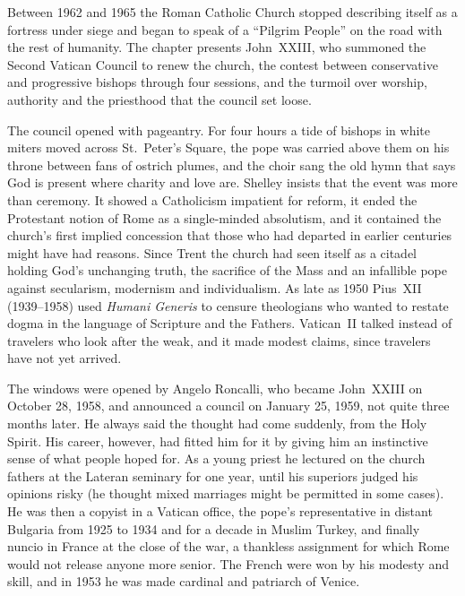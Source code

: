 
\begin{inbrief}
Between 1962 and 1965 the Roman Catholic Church stopped describing itself as a fortress under siege
and began to speak of a ``Pilgrim People'' on the road with the rest of humanity. The chapter
presents John~XXIII, who summoned the Second Vatican Council to renew the church, the contest between
conservative and progressive bishops through four sessions, and the turmoil over worship, authority
and the priesthood that the council set loose.
\end{inbrief}

The council opened with pageantry. For four hours a tide of bishops in white miters moved across
St.~Peter's Square, the pope was carried above them on his throne between fans of ostrich plumes, and
the choir sang the old hymn that says God is present where charity and love are. Shelley insists that
the event was more than ceremony. It showed a Catholicism impatient for reform, it ended the
Protestant notion of Rome as a single-minded absolutism, and it contained the church's first implied
concession that those who had departed in earlier centuries might have had reasons. Since Trent the
church had seen itself as a citadel holding God's unchanging truth, the sacrifice of the Mass and an
infallible pope against secularism, modernism and individualism. As late as 1950 Pius~XII
(1939--1958) used \emph{Humani Generis} to censure theologians who wanted to restate dogma in the
language of Scripture and the Fathers. Vatican~II talked instead of travelers who look after the
weak, and it made modest claims, since travelers have not yet arrived.

The windows were opened by Angelo Roncalli, who became John~XXIII on October 28, 1958, and announced
a council on January 25, 1959, not quite three months later. He always said the thought had come
suddenly, from the Holy Spirit. His career, however, had fitted him for it by giving him an
instinctive sense of what people hoped for. As a young priest he lectured on the church fathers at
the Lateran seminary for one year, until his superiors judged his opinions risky (he thought mixed
marriages might be permitted in some cases). He was then a copyist in a Vatican office, the pope's
representative in distant Bulgaria from 1925 to 1934 and for a decade in Muslim Turkey, and finally
nuncio in France at the close of the war, a thankless assignment for which Rome would not release
anyone more senior. The French were won by his modesty and skill, and in 1953 he was made cardinal
and patriarch of Venice.


